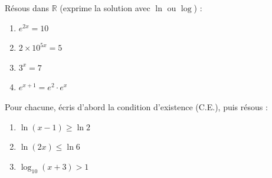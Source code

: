\documentclass[11pt,a4paper]{article}
\newcommand{\R}{\mathbb{R}}
\begin{document}
\begin{exo}
Résous dans $\R$ (exprime la solution avec $\ln$ ou $\log$) :
\begin{enumerate}[label=\alph*),leftmargin=2em,topsep=1pt,itemsep=1pt]
  \item $e^{2x}=10$ \qquad
  \item $2\times 10^{5x}=5$ \qquad
  \item $3^{x}=7$ \qquad
  \item $e^{x+1}=e^{2}\cdot e^{x}$
\end{enumerate}
\end{exo}

\begin{exo}
Pour chacune, écris d'abord la condition d'existence (C.E.), puis résous :
\begin{enumerate}[label=\alph*),leftmargin=2em,topsep=1pt,itemsep=1pt]
  \item $\ln(x-1)\geq\ln 2$
  \item $\ln(2x)\leq\ln 6$
  \item $\log_{10}(x+3)>1$
\end{enumerate}
\end{exo}
\end{document}
